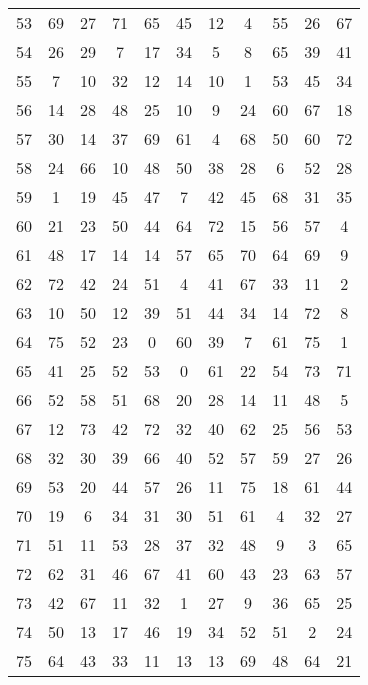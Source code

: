 \begin{table}
\begin{tabular}{c c c c c c c c c c c }
53 & 69 & 27 & 71 & 65 & 45 & 12 & 4 & 55 & 26 & 67 \\
54 & 26 & 29 & 7 & 17 & 34 & 5 & 8 & 65 & 39 & 41 \\
55 & 7 & 10 & 32 & 12 & 14 & 10 & 1 & 53 & 45 & 34 \\
56 & 14 & 28 & 48 & 25 & 10 & 9 & 24 & 60 & 67 & 18 \\
57 & 30 & 14 & 37 & 69 & 61 & 4 & 68 & 50 & 60 & 72 \\
58 & 24 & 66 & 10 & 48 & 50 & 38 & 28 & 6 & 52 & 28 \\
59 & 1 & 19 & 45 & 47 & 7 & 42 & 45 & 68 & 31 & 35 \\
60 & 21 & 23 & 50 & 44 & 64 & 72 & 15 & 56 & 57 & 4 \\
61 & 48 & 17 & 14 & 14 & 57 & 65 & 70 & 64 & 69 & 9 \\
62 & 72 & 42 & 24 & 51 & 4 & 41 & 67 & 33 & 11 & 2 \\
63 & 10 & 50 & 12 & 39 & 51 & 44 & 34 & 14 & 72 & 8 \\
64 & 75 & 52 & 23 & 0 & 60 & 39 & 7 & 61 & 75 & 1 \\
65 & 41 & 25 & 52 & 53 & 0 & 61 & 22 & 54 & 73 & 71 \\
66 & 52 & 58 & 51 & 68 & 20 & 28 & 14 & 11 & 48 & 5 \\
67 & 12 & 73 & 42 & 72 & 32 & 40 & 62 & 25 & 56 & 53 \\
68 & 32 & 30 & 39 & 66 & 40 & 52 & 57 & 59 & 27 & 26 \\
69 & 53 & 20 & 44 & 57 & 26 & 11 & 75 & 18 & 61 & 44 \\
70 & 19 & 6 & 34 & 31 & 30 & 51 & 61 & 4 & 32 & 27 \\
71 & 51 & 11 & 53 & 28 & 37 & 32 & 48 & 9 & 3 & 65 \\
72 & 62 & 31 & 46 & 67 & 41 & 60 & 43 & 23 & 63 & 57 \\
73 & 42 & 67 & 11 & 32 & 1 & 27 & 9 & 36 & 65 & 25 \\
74 & 50 & 13 & 17 & 46 & 19 & 34 & 52 & 51 & 2 & 24 \\
75 & 64 & 43 & 33 & 11 & 13 & 13 & 69 & 48 & 64 & 21 \\
\hline
\end{tabular}
\end{table}